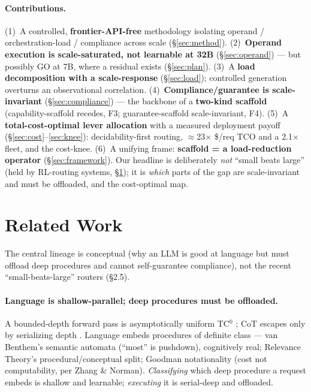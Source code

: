\documentclass[10pt]{article}
\begin{document}
\paragraph{Contributions.}
(1)~A controlled, \textbf{frontier-API-free} methodology isolating operand / orchestration-load / compliance across scale (\S\ref{sec:method}).
(2)~\textbf{Operand execution is scale-saturated, not learnable at 32B} (\S\ref{sec:operand}) --- but possibly GO at 7B, where a residual exists (\S\ref{sec:plan}).
(3)~A \textbf{load decomposition with a scale-response} (\S\ref{sec:load}); controlled generation overturns an observational correlation.
(4)~\textbf{Compliance/guarantee is scale-invariant} (\S\ref{sec:compliance}) --- the backbone of a \textbf{two-kind scaffold} (capability-scaffold recedes, F3; guarantee-scaffold scale-invariant, F4).
(5)~A \textbf{total-cost-optimal lever allocation} with a measured deployment payoff (\S\ref{sec:cost}--\ref{sec:knee}): decidability-first routing, $\approx$23$\times$ \$/req TCO and a 2.1$\times$ fleet, and the cost-knee.
(6)~A unifying frame: \textbf{scaffold = a load-reduction operator} (\S\ref{sec:framework}).
Our headline is deliberately \emph{not} ``small beats large'' (held by RL-routing systems, \S\ref{sec:related}); it is \emph{which} parts of the gap are scale-invariant and must be offloaded, and the cost-optimal map.

\section{Related Work}\label{sec:related}
The central lineage is conceptual (why an LLM is good at language but must offload deep procedures and cannot self-guarantee compliance), not the recent ``small-beats-large'' routers (\S2.5).

\paragraph{Language is shallow-parallel; deep procedures must be offloaded.} A bounded-depth forward pass is asymptotically uniform TC$^0$ \citep{ax2207_00729}; CoT escapes only by serializing depth \citep{ax2305_15408,ax2402_12875}. Language embeds procedures of definite class --- van Benthem's semantic automata (``most'' is pushdown), cognitively real; Relevance Theory's procedural/conceptual split; Goodman notationality (cost not computability, per Zhang \& Norman). \emph{Classifying} which deep procedure a request embeds is shallow and learnable; \emph{executing} it is serial-deep and offloaded.
\end{document}
